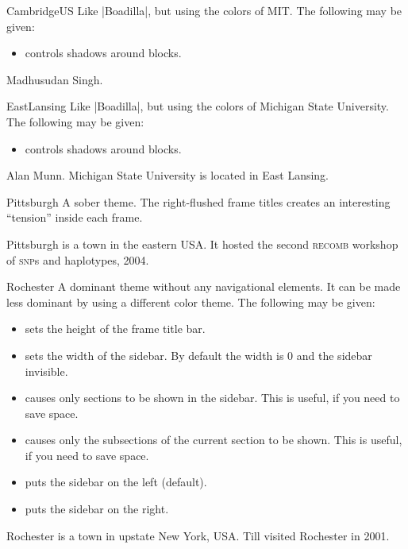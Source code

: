 \begin{themeexample}{CambridgeUS}
  Like |Boadilla|, but using the colors of MIT. The following  may be given:
  \begin{itemize}
  \item {} controls shadows around blocks.
  \end{itemize}

  \themeauthor Madhusudan Singh.
\end{themeexample}

\begin{themeexample}{EastLansing}
  Like |Boadilla|, but using the colors of Michigan State University. The following  may be given:
  \begin{itemize}
  \item {} controls shadows around blocks.
  \end{itemize}

  \themeauthor Alan Munn. Michigan State University is located in East Lansing.
\end{themeexample}

\begin{themeexample}{Pittsburgh}
  A sober theme. The right-flushed frame titles creates an interesting ``tension'' inside each frame.

  Pittsburgh is a town in the eastern USA. It hosted the second \textsc{recomb} workshop of \textsc{snp}s and haplotypes, 2004.
\end{themeexample}

\begin{themeexample}{Rochester}
  A dominant theme without any navigational elements. It can be made less dominant by using a different color theme. The following  may be given:
  \begin{itemize}
    \item {} sets the height of the frame title bar.
    \item {} sets the width of the sidebar. By default the width is 0 and the sidebar invisible.
    \item {} causes only sections to be shown in the sidebar. This is useful, if you need to save space.
    \item {} causes only the subsections of the current section to be shown. This is useful, if you need to save space.
    \item {} puts the sidebar on the left (default).
    \item {} puts the sidebar on the right.
  \end{itemize}

  Rochester is a town in upstate New York, USA. Till visited Rochester in 2001.
\end{themeexample}

